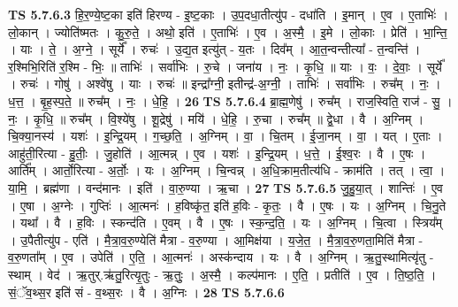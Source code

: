\documentclass[17pt]{extarticle}
\begin{document}
                  \newline
                                \textbf{ TS 5.7.6.3} \newline
                  हि॒र॒ण्ये॒ष्ट॒का इति॑ हिरण्य - इ॒ष्ट॒काः । उ॒प॒दधा॒तीत्यु॑प - दधा॑ति । इ॒मान् । ए॒व । ए॒ताभिः॑ । लो॒कान् । ज्योति॑ष्मतः । कु॒रु॒ते॒ । अथो॒ इति॑ । ए॒ताभिः॑ । ए॒व । अ॒स्मै॒ । इ॒मे । लो॒काः । प्रेति॑ । भा॒न्ति॒ । याः । ते॒ । अ॒ग्ने॒ । सूर्ये᳚ । रुचः॑ । उ॒द्य॒त इत्यु॑त् - य॒तः । दिव᳚म् । आ॒त॒न्वन्तीत्या᳚ - त॒न्वन्ति॑ । र॒श्मिभि॒रिति॑ र॒श्मि - भिः॒ ॥ ताभिः॑ । सर्वा॑भिः । रु॒चे । जना॑य । नः॒ । कृ॒धि॒ ॥ याः । वः॒ । दे॒वाः॒ । सूर्ये᳚ । रुचः॑ । गोषु॑ । अश्वे॑षु । याः । रुचः॑ ॥ इन्द्रा᳚ग्नी॒ इतीन्द्र॑-अ॒ग्नी॒ । ताभिः॑ । सर्वा॑भिः । रुच᳚म् । नः॒ । ध॒त्त॒ । बृ॒ह॒स्प॒ते॒ ॥ रुच᳚म् । नः॒ । धे॒हि॒ । \textbf{  26} \newline
                  \newline
                                \textbf{ TS 5.7.6.4} \newline
                  ब्रा॒ह्म॒णेषु॑ । रुच᳚म् । राज॒स्विति॒ राज॑ - सु॒ । नः॒ । कृ॒धि॒ ॥ रुच᳚म् । वि॒श्ये॑षु । शू॒द्रेषु॑ । मयि॑ । धे॒हि॒ । रु॒चा । रुच᳚म् ॥ द्वे॒धा । वै । अ॒ग्निम् । चि॒क्या॒नस्य॑ । यशः॑ । इ॒न्द्रि॒यम् । ग॒च्छ॒ति॒ । अ॒ग्निम् । वा॒ । चि॒तम् । ई॒जा॒नम् । वा॒ । यत् । ए॒ताः । आहु॑ती॒रित्या - हु॒तीः॒ । जु॒होति॑ । आ॒त्मन्न् । ए॒व । यशः॑ । इ॒न्द्रि॒यम् । ध॒त्ते॒ । ई॒श्व॒रः । वै । ए॒षः । आर्ति᳚म् । आर्तो॒रित्या - अ॒र्तोः॒ । यः । अ॒ग्निम् । चि॒न्वन्न् । अ॒धि॒क्राम॒तीत्य॑धि - क्राम॑ति । तत् । त्वा॒ । या॒मि॒ । ब्रह्म॑णा । वन्द॑मानः । इति॑ । वा॒रु॒ण्या । ऋ॒चा । \textbf{  27} \newline
                  \newline
                                \textbf{ TS 5.7.6.5} \newline
                  जु॒हु॒या॒त् । शान्तिः॑ । ए॒व । ए॒षा । अ॒ग्नेः । गुप्तिः॑ । आ॒त्मनः॑ । ह॒विष्कृ॑त॒ इति॑ ह॒विः - कृ॒तः॒ । वै । ए॒षः । यः । अ॒ग्निम् । चि॒नु॒ते । यथा᳚ । वै । ह॒विः । स्कन्द॑ति । ए॒वम् । वै । ए॒षः । स्क॒न्द॒ति॒ । यः । अ॒ग्निम् । चि॒त्वा । स्त्रिय᳚म् । उ॒पैतीत्यु॑प - एति॑ । मै॒त्रा॒व॒रु॒ण्येति॑ मैत्रा - व॒रु॒ण्या । आ॒मिक्ष॑या । य॒जे॒त॒ । मै॒त्रा॒व॒रु॒णता॒मिति॑ मैत्रा - व॒रु॒णता᳚म् । ए॒व । उपेति॑ । ए॒ति॒ । आ॒त्मनः॑ । अस्क॑न्दाय । यः । वै । अ॒ग्निम् । ऋ॒तु॒स्थामित्यृ॑तु - स्थाम् । वेद॑ । ऋ॒तुर्.ऋ॑तु॒रित्यृ॒तुः - ऋ॒तुः॒ । अ॒स्मै॒ । कल्प॑मानः । ए॒ति॒ । प्रतीति॑ । ए॒व । ति॒ष्ठ॒ति॒ । सं॒ॅव॒थ्स॒र इति॑ सं - व॒थ्स॒रः । वै । अ॒ग्निः । \textbf{  28} \newline
                  \newline
                                \textbf{ TS 5.7.6.6} \newline
\end{document}
